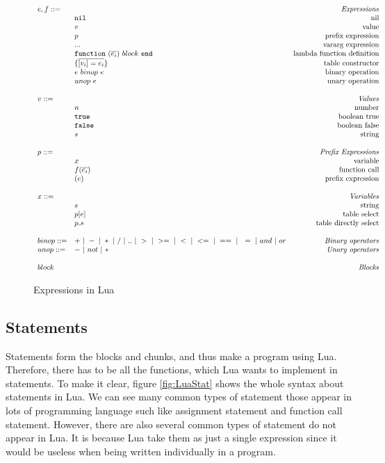 \documentclass{article}
\begin{document}
\begin{figure}
\caption{Expressions in Lua}
\label{fig:LuaExp}
\[
\begin{array}{llr}
  \mydefhead{e,f ::=\qquad\qquad\qquad\qquad}{Expressions}
  \mydefcase{\tt nil}{nil}
  \mydefcase{v}{value}
  \mydefcase{p}{prefix expression}
  \mydefcase{\tt ...}{vararg expression}
  \mydefcase{\functiondef e {block}}{lambda function definition}
  \mydefcase{\{\overline{[v_i] = e_i}\}}{table constructor}
  \mydefcase{e ~binop~ e}{binary operation}
  \mydefcase{unop~ e}{unary operation}
  \\
  \mydefhead{v ::=\qquad\qquad\qquad\qquad}{Values}
  \mydefcase{n}{number}
  \mydefcase{\tt true}{boolean true}
  \mydefcase{\tt false}{boolean false}
  \mydefcase{s}{string}
  \\
  \mydefhead{p ::=\qquad\qquad\qquad\qquad}{Prefix Expressions}
  \mydefcase{x}{variable}
  \mydefcase{f(\overline{e_i})}{function call}
  \mydefcase{(e)}{prefix expression}
  
  \\
  \mydefhead{x ::=\qquad\qquad\qquad\qquad}{Variables}
  \mydefcase{s}{string}
  \mydefcase{p[e]}{table select}
  \mydefcase{p.s}{table directly select}
  \\
  binop ::= & + ~|~ - ~|~ * ~|~ / ~|~ .. ~|~ > ~|~ >= ~|~ < ~|~ <= ~|~ == ~|~ ~= ~|~ and ~|~ or & \mbox{\emph{Binary operators}} \\
  unop ::= & - ~|~ not ~|~ *  & \mbox{\emph{Unary operators}} \\
  \\
  \mydefhead{block \qquad\qquad\qquad\qquad}{Blocks}
\end{array}
\]
\end{figure}



\subsection{Statements}
Statements form the blocks and chunks, and thus make a program using Lua. Therefore, there has to be all the functions, which Lua wants to implement in statements. To make it clear, figure \ref{fig:LuaStat} shows the whole syntax about statements in Lua. We can see many common types of statement those appear in lots of programming language such like assignment statement and function call statement. However, there are also several common types of statement do not appear in Lua. It is because Lua take them as just a single expression since it would be useless when being written individually in a program.
\end{document}
